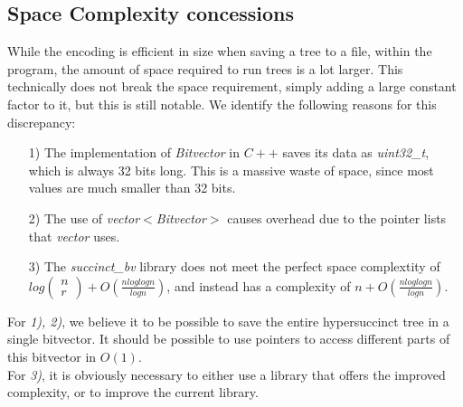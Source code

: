 \documentclass{article}
\begin{document}
\subsection{Space Complexity concessions}
While the encoding is efficient in size when saving a tree to a file, within the program, the amount of space required to run trees is a lot larger. This technically does not break the space requirement, simply adding a large constant factor to it, but this is still notable. We identify the following reasons for this discrepancy:\\
\begin{itemize}
	\item[1)] The implementation of \textit{Bitvector} in $C++$ saves its data as \textit{uint32\_t}, which is always 32 bits long. This is a massive waste of space, since most values are much smaller than 32 bits.
	\item[2)] The use of \textit{vector$<$Bitvector$>$} causes overhead due to the pointer lists that \textit{vector} uses.
	\item[3)] The \textit{succinct\_bv} library does not meet the perfect space complextity of $log(\begin{array}{c} n \\ r \end{array}) + O(\frac{n log log n}{log n})$, and instead has a complexity of $n + O(\frac{n log log n}{log n})$.
\end{itemize}
For \textit{1), 2)}, we believe it to be possible to save the entire hypersuccinct tree in a single bitvector. It should be possible to use pointers to access different parts of this bitvector in $O(1)$.\\
For \textit{3)}, it is obviously necessary to either use a library that offers the improved complexity, or to improve the current library.




\end{document}
